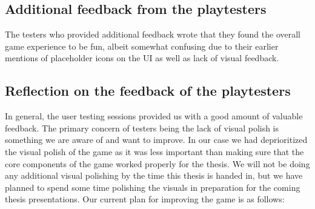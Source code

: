 \subsection{Additional feedback from the playtesters}
The testers who provided additional feedback wrote that they found the overall game experience to be fun, albeit somewhat confusing due to their earlier mentions of placeholder icons on the UI as well as lack of visual feedback. 
 
\subsection{Reflection on the feedback of the playtesters}
\label{sec:feedbackReflect}
In general, the user testing sessions provided us with a good amount of valuable feedback. The primary concern of testers being the lack of visual polish is something we are aware of and want to improve. In our case we had deprioritized the visual polish of the game as it was less important than making sure that the core components of the game worked properly for the thesis. We will not be doing any additional visual polishing by the time this thesis is handed in, but we have planned to spend some time polishing the visuals in preparation for the coming thesis presentations. Our current plan for improving the game is as follows:

